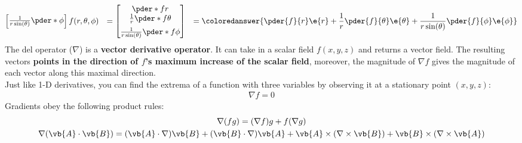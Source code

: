 \begin{align*}
\begin{bmatrix}
                    \frac{1}{r \sin(\theta)}\pder*{\phi}
                \end{bmatrix}
                f(r,\theta,\phi)
                &&=
                \begin{bmatrix}
                    \pder*{f}{r}
                    \\
                    \frac{1}{r} \pder*{f}{\theta}
                    \\[5pt]
                    \frac{1}{r \sin(\theta)}\pder*{f}{\phi}
                \end{bmatrix}
                &&=
                \coloredanswer{\pder{f}{r}\e{r}+\frac{1}{r} \pder{f}{\theta}\e{\theta}+\frac{1}{r \sin(\theta)}\pder{f}{\phi}\e{\phi}}
        \end{align*}
        The del operator ($\nabla$) is a \textcolor{Blue1}{\bf vector derivative operator}. It can take in a scalar field $f(x,y,z)$ and returns a vector field. The resulting vectors \textcolor{Blue1}{\bf points in the direction of \(f\)'s maximum increase of the scalar field}, moreover, the magnitude of \(\nabla f\) gives the magnitude of each vector along this maximal direction.
        \\[0.5 cm]
        Just like 1-D derivatives, you can find the extrema of a function with three variables by observing it at a stationary point \((x,y,z)\):
        \begin{align*}
            \nabla f = 0 
        \end{align*}
        Gradients obey the following product rules:
        \begin{gather*}
            \nabla (fg) = (\nabla f)g + f (\nabla g) 
            \\
            \nabla (\vb{A} \cdot \vb{B}) 
            = (\vb{A} \cdot \nabla)\vb{B} + (\vb{B} \cdot \nabla)\vb{A}+ \vb{A} \times (\nabla \times \vb{B}) + \vb{B} \times(\nabla \times \vb{A}) \\
        \end{gather*}
    \newpage
